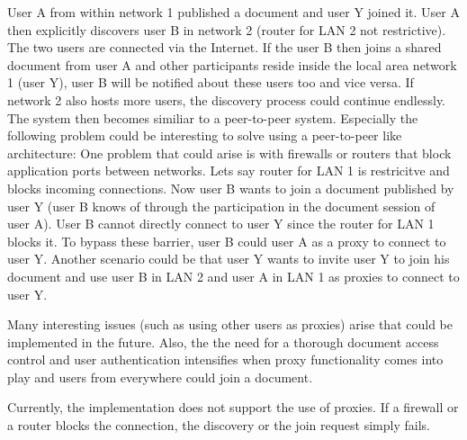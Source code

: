 User A from within network 1 published a document and user Y joined it. User A then explicitly discovers user B in network 2 (router for LAN 2 not restrictive). The two users are connected via the Internet. If the user B then joins a shared document from user A and other participants reside inside the local area network 1 (user Y), user B will be notified about these users too and vice versa. If network 2 also hosts more users, the discovery process could continue endlessly. The system then becomes similiar to a peer-to-peer system. Especially the following problem could be interesting to solve using a peer-to-peer like architecture: One problem that could arise is with firewalls or routers that block application ports between networks. Lets say router for LAN 1 is restricitve and blocks incoming connections. Now user B wants to join a document published by user Y (user B knows of through the participation in the document session of user A). User B cannot directly connect to user Y since the router for LAN 1 blocks it. To bypass these barrier, user B could user A as a proxy to connect to user Y.
Another scenario could be that user Y wants to invite user Y to join his document and use user B in LAN 2 and user A in LAN 1 as proxies to connect to user Y. 

Many interesting issues (such as using other users as proxies) arise that could be implemented in the future. Also, the the need for a thorough document access control and user authentication intensifies when proxy functionality comes into play and users from everywhere could join a document.

Currently, the implementation does not support the use of proxies. If a firewall or a router blocks the connection,  the discovery or the join request simply fails.